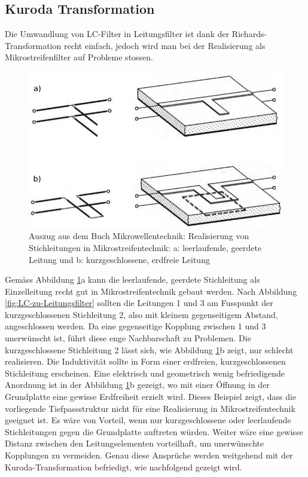 \subsection{Kuroda Transformation}

Die   Umwandlung   von   LC-Filter   in   Leitungsfilter    ist    dank    der
Richards-Transformation recht einfach, jedoch  wird  man  bei der Realisierung
als Mikrostreifenfilter auf Probleme stossen.

\begin{figure}[h!]
    \centering
    \includegraphics[width=\imagewidth]{images/mikrostreifen}
    \caption{Auszug aus dem Buch Mikrowellentechnik\cite[p.~27]{ref:baechold}: Realisierung von Stichleitungen in Mikrostreifentechnik: a: leerlaufende, geerdete Leitung und b: kurzgeschlossene, erdfreie Leitung}
    \label{fig:mikrostreifen}
\end{figure}

Gem\"ass Abbildung \ref{fig:mikrostreifen}a  kann  die  leerlaufende, geerdete
Stichleitung  als  Einzelleitung  recht  gut  in  Mikrostreifentechnik  gebaut
werden.  Nach Abbildung \ref{fig:LC-zu-Leitungsfilter} sollten die Leitungen 1
und 3 am Fusspunkt  der  kurzgeschlossenen  Stichleitung  2,  also mit kleinem
gegenseitigem  Abstand, angeschlossen werden. Da  eine  gegenseitige  Kopplung
zwischen  1  und  3  unerw\"unscht  ist,  f\"uhrt diese enge Nachbarschaft  zu
Problemen.  Die  kurzgeschlossene  Stichleitung  2 l\"asst sich, wie Abbildung
\ref{fig:mikrostreifen}b zeigt, nur schlecht realisieren.  Die  Induktivit\"at
sollte  in  Form  einer  erdfreien, kurzgeschlossenen Stichleitung erscheinen.
Eine  elektrisch  und  geometrisch  wenig  befriedigende  Anordnung ist in der
Abbildung \ref{fig:mikrostreifen}b  gezeigt,  wo  mit  einer  \"Offnung in der
Grundplatte eine gewisse Erdfreiheit erzielt wird. Dieses Beispiel zeigt, dass
die   vorliegende   Tiefpassstruktur   nicht   f\"ur  eine   Realisierung   in
Mikrostreifentechnik   geeignet  ist.  Es  w\"are  von   Vorteil,   wenn   nur
kurzgeschlossene  oder  leerlaufende  Stichleitungen  gegen   die  Grundplatte
auftreten  w\"urden.  Weiter   w\"are   eine   gewisse  Distanz  zwischen  den
Leitungselementen  vorteilhaft,  um  unerw\"unschte  Kopplungen zu  vermeiden.
Genau  diese  Anspr\"uche  werden  weitgehend  mit  der  Kuroda-Transformation
befriedigt, wie nachfolgend gezeigt wird.

